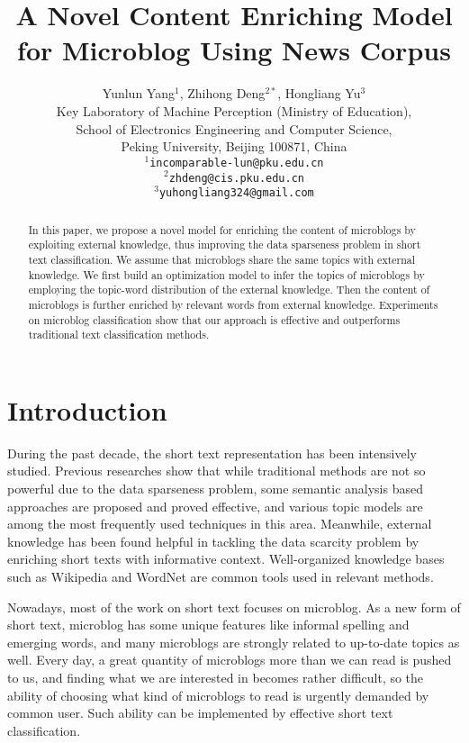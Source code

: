 \documentclass[11pt]{article}
\title{A Novel Content Enriching Model for Microblog Using News Corpus}
\author{Yunlun Yang$^1$, Zhihong Deng$^{2*}$, Hongliang Yu$^3$\\
   Key Laboratory of Machine Perception (Ministry of Education),\\
   School of Electronics Engineering and Computer Science,\\
   Peking University, Beijing 100871, China\\
  {\tt $^1$incomparable-lun@pku.edu.cn}\\
  {\tt $^2$zhdeng@cis.pku.edu.cn}\\
  {\tt $^3$yuhongliang324@gmail.com}
  }
\date{}
\begin{document}
\maketitle
\renewcommand{\thefootnote}{}
\begin{abstract}
In this paper, we propose a novel model for enriching the content of microblogs by exploiting external knowledge, thus improving the data sparseness problem in short text classification. We assume that microblogs share the same topics with external knowledge. 
We first build an optimization model to infer the topics of microblogs by employing the topic-word distribution of the external knowledge. Then the content of microblogs is further enriched by relevant words from external knowledge.
Experiments on microblog classification show that our approach is effective and outperforms traditional text classification methods. 
\end{abstract}

\section{Introduction}

During the past decade, the short text representation has been intensively studied. Previous researches  \cite{Phan:08,Guo:12} show that while traditional methods are not so powerful due to the data sparseness problem, some semantic analysis based approaches are proposed and proved effective, and various topic models are among the most frequently used techniques in this area. Meanwhile, external knowledge has been found helpful \cite{Hu:09} in tackling the data scarcity problem by enriching short texts with informative context. Well-organized knowledge bases such as Wikipedia and WordNet are common tools used in relevant methods.

Nowadays, most of the work on short text focuses on microblog. As a new form of short text, microblog has some unique features like informal spelling and emerging words, and many microblogs are strongly related to up-to-date topics as well. Every day, a great quantity of microblogs more than we can read is pushed to us, and finding what we are interested in becomes rather difficult, so the ability of choosing what kind of microblogs to read is urgently demanded by common user. Such ability can be implemented by effective short text classification.
\end{document}
